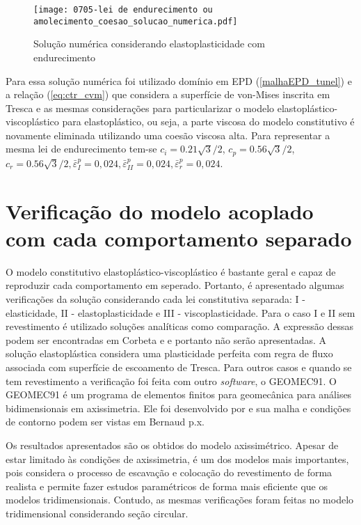 \begin{figure}[H]
	\begin{center}
		\texttt{[image: 0705-lei de endurecimento ou amolecimento\_coesao\_solucao\_numerica.pdf]}
	\end{center}
	\caption{\label{solucao_numérica_LAJSS}Solução numérica considerando elastoplasticidade com endurecimento}
\end{figure}
Para essa solução numérica foi utilizado domínio em EPD (\autoref{malhaEPD_tunel}) e a relação (\ref{eq:ctr_cvm}) que considera a superfície de von-Mises inscrita em Tresca e as mesmas considerações para particularizar o modelo elastoplástico-viscoplástico para elastoplástico, ou seja, a parte viscosa do modelo constitutivo é novamente eliminada utilizando uma coesão viscosa alta. Para representar a mesma lei de endurecimento tem-se $c_i = 0.21\sqrt{3}/2$, $c_p = 0.56\sqrt{3}/2$, $c_r = 0.56\sqrt{3}/2, \bar \varepsilon^p_{I} = 0,024, \bar \varepsilon^p_{II} = 0,024, \bar \varepsilon^p_{r} = 0,024$. 

\section{Verificação do modelo acoplado com cada comportamento separado}
O modelo constitutivo elastoplástico-viscoplástico é bastante geral e capaz de reproduzir cada comportamento em seperado. Portanto, é apresentado algumas verificações da solução considerando cada lei constitutiva separada: I - elasticidade, II - elastoplasticidade e III - viscoplasticidade. Para o caso I e II sem revestimento é utilizado soluções analíticas como comparação. A expressão dessas podem ser encontradas em Corbeta e  e portanto não serão apresentadas. A solução elastoplástica considera uma plasticidade perfeita com regra de fluxo associada com superfície de escoamento de Tresca. Para outros casos e quando se tem revestimento a verificação foi feita com outro \textit{software}, o GEOMEC91. O GEOMEC91 é um programa de elementos finitos para geomecânica para análises bidimensionais em axissimetria. Ele foi desenvolvido por  e sua malha e condições de contorno podem ser vistas em Bernaud p.x.

Os resultados apresentados são os obtidos do modelo axissimétrico. Apesar de estar limitado às condições de axissimetria, é um dos modelos mais importantes, pois considera o processo de escavação e colocação do revestimento de forma realista e permite fazer estudos paramétricos de forma mais eficiente que os modelos tridimensionais. Contudo, as mesmas verificações foram feitas no modelo tridimensional considerando seção circular.

